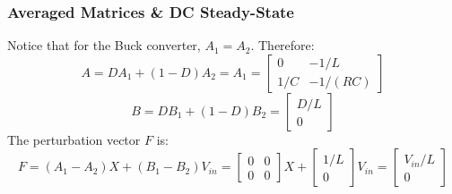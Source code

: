 \subsubsection{Averaged Matrices \& DC Steady-State}
Notice that for the Buck converter, $A_1 = A_2$. Therefore:
\begin{equation}
A = D A_1 + (1-D) A_2 = A_1 = \begin{bmatrix} 0 & -1/L \\ 1/C & -1/(RC) \end{bmatrix}
\end{equation}
\begin{equation}
B = D B_1 + (1-D) B_2 = \begin{bmatrix} D/L \\ 0 \end{bmatrix}
\end{equation}
The perturbation vector $F$ is:
\begin{equation}
F = (A_1 - A_2) X + (B_1 - B_2) V_{in} = \begin{bmatrix} 0 & 0 \\ 0 & 0 \end{bmatrix} X + \begin{bmatrix} 1/L \\ 0 \end{bmatrix} V_{in} = \begin{bmatrix} V_{in}/L \\ 0 \end{bmatrix}
\end{equation}

